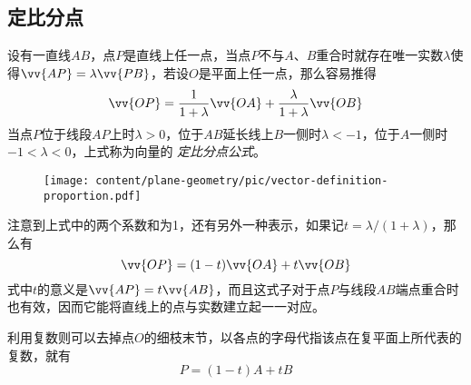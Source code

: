 \subsection{定比分点}
\label{sec:definition-proportion}

设有一直线$AB$，点$P$是直线上任一点，当点$P$不与$A$、$B$重合时就存在唯一实数$\lambda$使得$\vv{AP}=\lambda\vv{PB}$，若设$O$是平面上任一点，那么容易推得
\begin{equation}
  \label{eq:vector-definition-proportion}
  \vv{OP} = \frac{1}{1+\lambda} \vv{OA} + \frac{\lambda}{1+\lambda} \vv{OB}
\end{equation}
当点$P$位于线段$AP$上时$\lambda>0$，位于$AB$延长线上$B$一侧时$\lambda<-1$，位于$A$一侧时$-1<\lambda<0$，上式称为向量的 \emph{定比分点公式}。

\begin{figure}[htbp]
\centering
\texttt{[image: content/plane-geometry/pic/vector-definition-proportion.pdf]}
\caption{}
\label{fig:vector-definition-proportion}
\end{figure}

注意到上式中的两个系数和为1，还有另外一种表示，如果记$t= \lambda / (1+\lambda)$，那么有
\begin{equation}
  \label{eq:vector-definition-proportion-t}
  \vv{OP} = (1-t) \vv{OA} + t \vv{OB}
\end{equation}
式中$t$的意义是$\vv{AP} = t \vv{AB}$，而且这式子对于点$P$与线段$AB$端点重合时也有效，因而它能将直线上的点与实数建立起一一对应。

利用复数则可以去掉点$O$的细枝末节，以各点的字母代指该点在复平面上所代表的复数，就有
\begin{equation}
  \label{eq:complex-definition-proportion}
  P = (1-t)A + tB
\end{equation}

